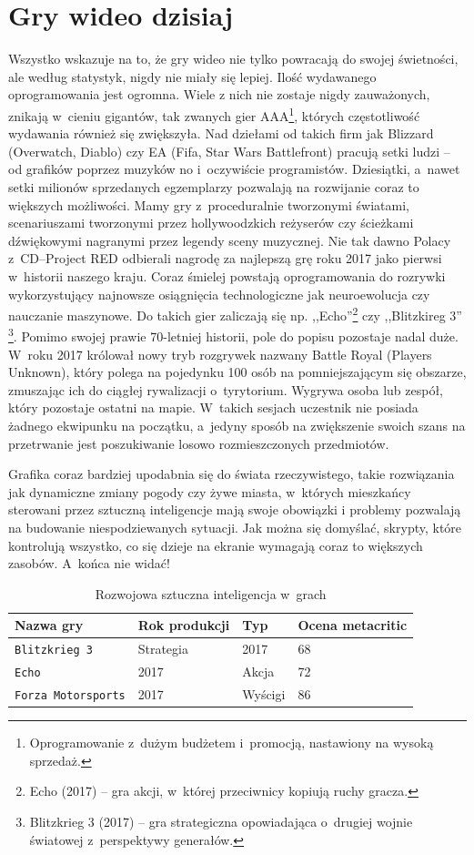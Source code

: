 \documentclass[brudnopis]{xmgr}
\begin{document}
\section{Gry wideo dzisiaj\label{s:dtd}}
Wszystko wskazuje na to, że gry wideo nie tylko powracają do
swojej świetności, ale według statystyk, nigdy nie miały się
lepiej. Ilość wydawanego oprogramowania jest ogromna. Wiele
z nich nie zostaje nigdy zauważonych, znikają w~cieniu gigantów, tak
zwanych gier AAA\footnote{Oprogramowanie z~dużym budżetem i~promocją, nastawiony na wysoką sprzedaż.}, których częstotliwość wydawania również się zwiększyła. 
Nad dziełami od takich firm jak Blizzard (Overwatch, Diablo) czy EA (Fifa, Star Wars Battlefront) pracują setki ludzi -- od grafików poprzez muzyków no i~oczywiście programistów. Dziesiątki, a~nawet setki milionów sprzedanych egzemplarzy pozwalają na rozwijanie coraz to większych możliwości. Mamy gry z~proceduralnie tworzonymi światami, scenariuszami tworzonymi przez hollywoodzkich reżyserów czy ścieżkami dźwiękowymi nagranymi przez legendy sceny muzycznej. Nie tak dawno Polacy z~CD--Project RED odbierali nagrodę za
najlepszą grę roku 2017 jako pierwsi w~historii naszego kraju. Coraz śmielej powstają oprogramowania do rozrywki wykorzystujący najnowsze osiągnięcia technologiczne jak neuroewolucja czy nauczanie maszynowe. Do takich gier zaliczają się np. ,,Echo''\footnote{Echo (2017) -- gra akcji, w~której przeciwnicy kopiują ruchy gracza.} czy ,,Blitzkireg 3''
\footnote{Blitzkrieg 3 (2017) -- gra strategiczna opowiadająca o~drugiej wojnie światowej z~perspektywy generałów.}. Pomimo swojej prawie 70-letniej historii, pole do popisu pozostaje nadal duże. W~roku 2017 królował nowy tryb rozgrywek nazwany Battle
Royal (Players Unknown), który polega na pojedynku 100 osób na
pomniejszającym się obszarze, zmuszając ich do ciągłej rywalizacji o~tyrytorium. Wygrywa osoba lub zespół, który pozostaje
ostatni na mapie. W~takich sesjach uczestnik nie posiada żadnego ekwipunku na początku, a~jedyny sposób na zwiększenie swoich szans na przetrwanie jest poszukiwanie losowo rozmieszczonych przedmiotów.

Grafika coraz bardziej upodabnia się do świata rzeczywistego, takie
rozwiązania jak dynamiczne zmiany pogody czy żywe miasta, w~których
mieszkańcy sterowani przez sztuczną inteligencje mają swoje obowiązki i
problemy pozwalają na budowanie niespodziewanych sytuacji. Jak można się
domyślać, skrypty, które kontrolują wszystko, co się dzieje na ekranie
wymagają coraz to większych zasobów. A~końca nie widać!
\begin{table}[!htb]
\centering
\begin{tabular}{|l|l|l|l|} \hline
Nazwa gry & Rok produkcji & Typ & Ocena metacritic \\ \hline
\texttt{Blitzkrieg 3} & Strategia & 2017 & 68 \\ \hline
\texttt{Echo} & 2017 & Akcja & 72 \\ \hline
\texttt{Forza Motorsports} & 2017 & Wyścigi & 86 \\ \hline
\end{tabular}
\caption{Rozwojowa sztuczna inteligencja w~grach\label{zest:proces:xslt}}
\end{table}
\end{document}
